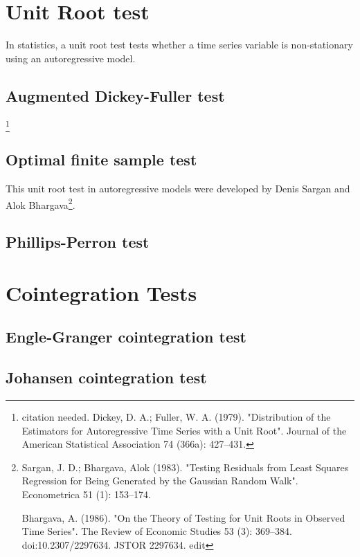 \section{Unit Root test}

In statistics, a unit root test tests whether a time series variable is non-stationary using an autoregressive model.

\subsection{Augmented Dickey-Fuller test}

\footnote{citation needed. Dickey, D. A.; Fuller, W. A. (1979). "Distribution of the Estimators for Autoregressive Time Series with a Unit Root". Journal of the American Statistical Association 74 (366a): 427–431.}

\subsection{Optimal finite sample test}

This unit root test in autoregressive models were developed by Denis Sargan and Alok Bhargava\footnote{Sargan, J. D.; Bhargava, Alok (1983). "Testing Residuals from Least Squares Regression for Being Generated by the Gaussian Random Walk". Econometrica 51 (1): 153–174.

Bhargava, A. (1986). "On the Theory of Testing for Unit Roots in Observed Time Series". The Review of Economic Studies 53 (3): 369–384. doi:10.2307/2297634. JSTOR 2297634. edit}.

\subsection{Phillips-Perron test}



\section{Cointegration Tests}

\subsection{Engle-Granger cointegration test}

\subsection{Johansen cointegration test}

